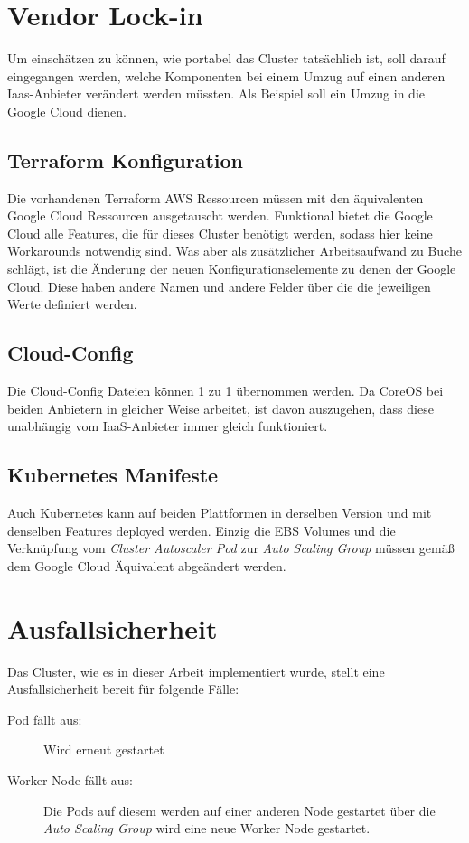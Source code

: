 \section{Vendor Lock-in}

Um einschätzen zu können, wie portabel das Cluster tatsächlich ist, soll
darauf eingegangen werden, welche Komponenten bei einem Umzug auf einen
anderen Iaas-Anbieter verändert werden müssten. Als Beispiel soll ein Umzug
in die Google Cloud dienen.

\subsection{Terraform Konfiguration}

Die vorhandenen
Terraform AWS Ressourcen müssen mit den äquivalenten Google Cloud Ressourcen
ausgetauscht werden.
Funktional bietet die Google Cloud alle Features, die für dieses Cluster
benötigt werden,
sodass hier keine Workarounds notwendig sind.
Was aber als zusätzlicher Arbeitsaufwand zu Buche schlägt, ist die
Änderung der neuen Konfigurationselemente zu denen der Google Cloud.
Diese haben andere Namen und andere Felder über die die jeweiligen Werte
definiert werden.

\subsection{Cloud-Config}
Die Cloud-Config Dateien können 1 zu 1 übernommen werden. Da CoreOS bei beiden
Anbietern in gleicher Weise arbeitet, ist davon auszugehen, dass diese
unabhängig vom IaaS-Anbieter immer gleich funktioniert.

\subsection{Kubernetes Manifeste}
Auch Kubernetes kann auf beiden Plattformen in derselben Version und mit
denselben Features deployed werden. Einzig die EBS Volumes und
die Verknüpfung vom \emph{Cluster Autoscaler Pod} zur \emph{Auto Scaling Group} müssen
gemäß dem Google Cloud \"Aquivalent abgeändert werden.

\section{Ausfallsicherheit}

Das Cluster, wie es in dieser Arbeit implementiert wurde, stellt eine Ausfallsicherheit
bereit für folgende Fälle:
\begin{description}
  \item[Pod fällt aus:] Wird erneut gestartet
  \item[Worker Node fällt aus:] Die Pods auf diesem werden auf einer
  anderen Node gestartet
  über die \emph{Auto Scaling Group} wird eine neue Worker Node gestartet.
\end{description}

